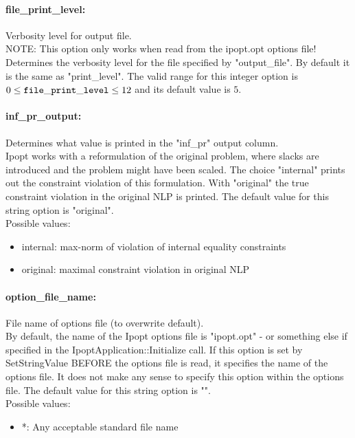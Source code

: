\paragraph{file\_print\_level:}\label{sec:file_print_level} Verbosity level for output file. $\;$ \\
 NOTE: This option only works when read from the
ipopt.opt options file! Determines the verbosity
level for the file specified by "output\_file". 
By default it is the same as "print\_level". The valid range for this integer option is
$0 \le {\tt file\_print\_level } \le 12$
and its default value is $5$.


\paragraph{inf\_pr\_output:}\label{sec:inf_pr_output} Determines what value is printed in the "inf\_pr" output column. $\;$ \\
 Ipopt works with a reformulation of the original
problem, where slacks are introduced and the
problem might have been scaled.  The choice
"internal" prints out the constraint violation of
this formulation. With "original" the true
constraint violation in the original NLP is
printed.
The default value for this string option is "original".
\\ 
Possible values:
\begin{itemize}
   \item internal: max-norm of violation of internal equality
constraints
   \item original: maximal constraint violation in original NLP
\end{itemize}

\paragraph{option\_file\_name:}\label{sec:option_file_name} File name of options file (to overwrite default). $\;$ \\
 By default, the name of the Ipopt options file is
"ipopt.opt" - or something else if specified in
the IpoptApplication::Initialize call. If this
option is set by SetStringValue BEFORE the
options file is read, it specifies the name of
the options file.  It does not make any sense to
specify this option within the options file.
The default value for this string option is "".
\\ 
Possible values:
\begin{itemize}
   \item *: Any acceptable standard file name
\end{itemize}

